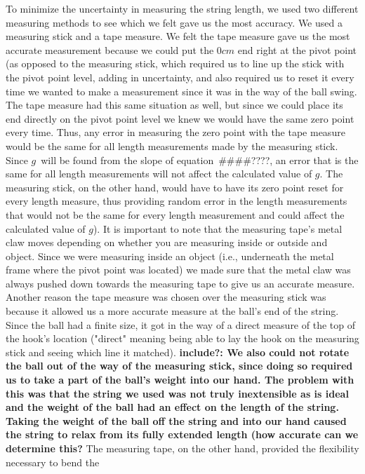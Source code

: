 \documentclass[iop]{emulateapj}
\def\g{$g$}
\def\fillin{\#\#\#\#????}
\begin{document}
To minimize the uncertainty in measuring the string length, we used two 
different measuring methods to see which we felt gave us the most accuracy. 
We used a measuring stick and a tape measure.  We felt the tape measure gave 
us the most accurate measurement because we could put the $0cm$ end right at 
the pivot point (as opposed to the measuring stick, which required us to line 
up the stick with the pivot point level, adding in uncertainty, and also 
required us to reset it every time we wanted to make a measurement since it 
was in the way of the ball swing. The tape measure had this same situation 
as well, but since we could place its end directly on the pivot point level 
we knew we would have the same zero point every time. Thus, any error in 
measuring the zero point with the tape measure would be the same for all 
length measurements made by the measuring stick.  Since \g\ will be found 
from the slope of equation~\fillin, an error that is the same for all length 
measurements will not affect the calculated value of \g.  The measuring stick, 
on the other hand, would have to have its zero point reset for every length 
measure, thus providing random error in the length measurements that would 
not be the same for every length measurement and could affect the calculated 
value of \g).  It is important to note that the measuring tape's metal claw 
moves depending on whether you are measuring inside or outside and object. 
Since we were measuring inside an object (i.e., underneath the metal frame 
where the pivot point was located) we made sure that the metal claw was always 
pushed down towards the measuring tape to give us an accurate measure.  
Another reason the tape measure was chosen over the measuring stick was 
because it allowed us a more accurate measure at the ball's end of the string. 
Since the ball had a finite size, it got in the way of a direct measure of the 
top of the hook's location ("direct" meaning being able to lay the hook on the 
measuring stick and seeing which line it matched). {\bf include?:  We also could not rotate 
the ball out of the way of the measuring stick, since doing so required us to 
take a part of the ball's weight into our hand.  The problem with this was 
that the string we used was not truly inextensible as is ideal and the weight 
of the ball had an effect on the length of the string.  Taking the weight of 
the ball off the string and into our hand caused the string to relax from its 
fully extended length (how accurate can we determine this?}  The measuring 
tape, on the other hand, provided the flexibility necessary to bend the 
\end{document}
